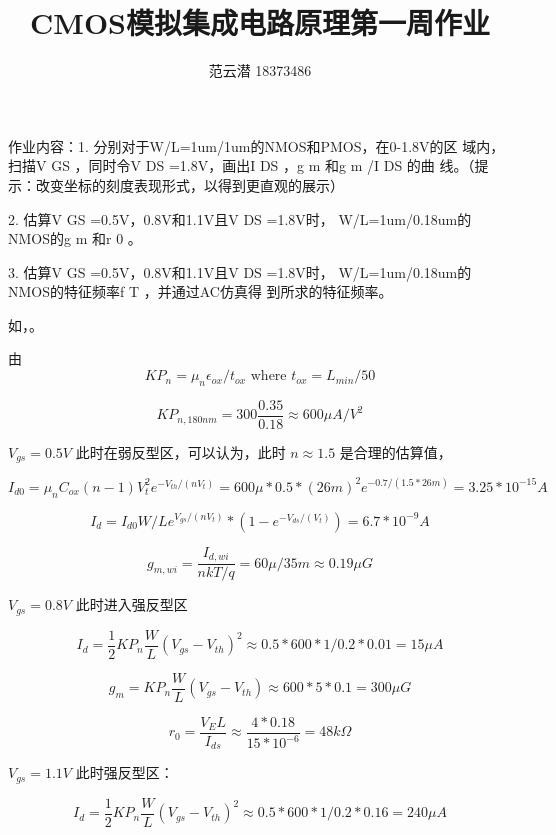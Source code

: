 \documentclass[lang=cn,11pt,a4paper,cite=authoryear]{elegantpaper}
\title{CMOS模拟集成电路原理\quad 第一周作业}
\author{范云潜 18373486}
\institute{微电子学院 184111 班}
\date{\zhtoday}
\begin{document}
\maketitle

作业内容：1. 分别对于W/L=1um/1um的NMOS和PMOS，在0-1.8V的区
域内，扫描V GS ，同时令V DS =1.8V，画出I DS ，g m 和g m /I DS 的曲
线。（提示：改变坐标的刻度表现形式，以得到更直观的展示）

2. 估算V GS =0.5V，0.8V和1.1V且V DS =1.8V时，
W/L=1um/0.18um的NMOS的g m 和r 0 。

3. 估算V GS =0.5V，0.8V和1.1V且V DS =1.8V时，
W/L=1um/0.18um的NMOS的特征频率f T ，并通过AC仿真得
到所求的特征频率。




如，。




由 \[KP_n = \mu_n \epsilon_{ox} / t_{ox} \text{ where } t_{ox} = L_{min} / 50\]

\[KP_{n,180 nm} = 300 \frac{0.35}{0.18} \approx 600 \mu A/V^2\]



\(V_{gs} = 0.5 V\) 此时在弱反型区，可以认为，此时 \(n \approx 1.5\) 是合理的估算值，

\[I_{d0} = \mu_n C_{ox} (n-1) V_t^2 e^{-V_{th}/(nV_t)} = 600 \mu * 0.5 * (26 m)^2 e^{-0.7/(1.5*26 m)} = 3.25 * 10^{-15} A\] 

\[I_{d} = I_{d0} W/L e^{V_{gs}/(n V_t)} * (1 - e^{-V_{ds}/(V_t)}) = 6.7 * 10^{-9}A\]

\[g_{m,wi} = \frac{I_{d,wi}}{nkT/q} = 60 \mu / 35 m \approx 0.19 \mu G \]



\(V_{gs} = 0.8 V\) 此时进入强反型区

\[I_{d} = \frac{1}{2} KP_n \frac{W}{L} (V_{gs}-V_{th})^2\approx 0.5 * 600 * 1 / 0.2 * 0.01 = 15 \mu A \] 

\[g_m = KP_n \frac{W}{L} (V_{gs}-V_{th}) \approx 600 * 5 * 0.1 = 300 \mu G\] 

\[r_0 = \frac{V_E L}{I_{ds}} \approx \frac{4 * 0.18}{15 * 10^{-6}} = 48 k\Omega\]


\(V_{gs} = 1.1 V\) 此时强反型区：

\[I_{d} = \frac{1}{2} KP_n \frac{W}{L} (V_{gs}-V_{th})^2\approx 0.5 * 600 * 1 / 0.2 * 0.16 = 240 \mu A \] 
\end{document}
